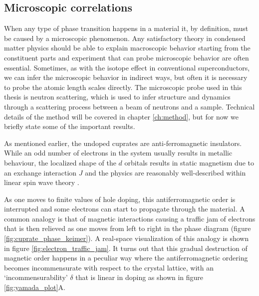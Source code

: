 \subsection{Microscopic correlations}
When any type of phase transition happens in a material it, by definition, must be caused by a microscopic phenomenon. Any satisfactory theory in condensed matter physics should be able to explain macroscopic behavior starting from the constituent parts and experiment that can probe microscopic behavior are often essential. Sometimes, as with the isotope effect in conventional superconductors, we can infer the microscopic behavior in indirect ways, but often it is necessary to probe the atomic length scales directly. The microscopic probe used in this thesis is neutron scattering, which is used to infer structure and dynamics through a scattering process between a beam of neutrons and a sample. Technical details of the method will be covered in chapter \ref{ch:method}, but for now we briefly state some of the important results.

As mentioned earlier, the undoped cuprates are anti-ferromagnetic insulators. While an odd number of electrons in the system usually results in metallic behaviour, the localized shape of the $d$ orbitals results in static magnetism due to an exchange interaction $J$ and the physics are reasonably well-described within linear spin wave theory \cite{Headings2010}.

As one moves to finite values of hole doping, this antiferromagnetic order is interrupted and some electrons can start to propagate through the material. A common analogy is that of magnetic interactions causing a traffic jam of electrons that is then relieved as one moves from left to right in the phase diagram (figure \ref{fig:cuprate_phase_keimer}). A real-space visualization of this analogy is shown in figure \ref{fig:electron_traffic_jam}. It turns out that this gradual destruction of magnetic order happens in a peculiar way where the antiferromagnetic ordering becomes incommensurate with respect to the crystal lattice, with an `incommensurability' $\delta$ that is linear in doping as shown in figure \ref{fig:yamada_plot}A.

